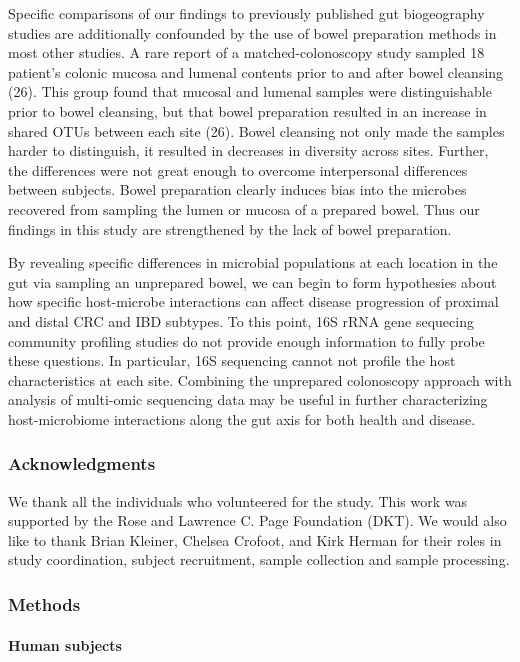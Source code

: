 \documentclass[11pt,]{article}
\let\oldparagraph\paragraph
\renewcommand{\paragraph}[1]{\oldparagraph{#1}\mbox{}}
\begin{document}
Specific comparisons of our findings to previously published gut
biogeography studies are additionally confounded by the use of bowel
preparation methods in most other studies. A rare report of a
matched-colonoscopy study sampled 18 patient's colonic mucosa and
lumenal contents prior to and after bowel cleansing (26). This group
found that mucosal and lumenal samples were distinguishable prior to
bowel cleansing, but that bowel preparation resulted in an increase in
shared OTUs between each site (26). Bowel cleansing not only made the
samples harder to distinguish, it resulted in decreases in diversity
across sites. Further, the differences were not great enough to overcome
interpersonal differences between subjects. Bowel preparation clearly
induces bias into the microbes recovered from sampling the lumen or
mucosa of a prepared bowel. Thus our findings in this study are
strengthened by the lack of bowel preparation.

By revealing specific differences in microbial populations at each
location in the gut via sampling an unprepared bowel, we can begin to
form hypothesies about how specific host-microbe interactions can affect
disease progression of proximal and distal CRC and IBD subtypes. To this
point, 16S rRNA gene sequecing community profiling studies do not
provide enough information to fully probe these questions. In
particular, 16S sequencing cannot not profile the host characteristics
at each site. Combining the unprepared colonoscopy approach with
analysis of multi-omic sequencing data may be useful in further
characterizing host-microbiome interactions along the gut axis for both
health and disease.

\subsubsection{Acknowledgments}\label{acknowledgments}

We thank all the individuals who volunteered for the study. This work
was supported by the Rose and Lawrence C. Page Foundation (DKT). We
would also like to thank Brian Kleiner, Chelsea Crofoot, and Kirk Herman
for their roles in study coordination, subject recruitment, sample
collection and sample processing.

\subsubsection{Methods}\label{methods}

\paragraph{Human subjects}\label{human-subjects}
\end{document}
